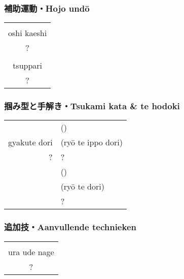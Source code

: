 \subsubsection{補助運動・Hojo und\={o}}
\begin{table}[H]
\begin{center}
\begin{tabular}{c}
    \ruby{}{}\ruby{}{}\\
    oshi kaeshi\\
    ?\\
    \hline
    \ruby{}{}\\
    tsuppari\\
    ?
\end{tabular}
\end{center}
\label{kyuu_5_hojo_undou}
\end{table}

\subsubsection{掴み型と手解き・Tsukami kata \& te hodoki}
\begin{table}[H]
\begin{center}
\begin{tabular}{rl}
    \ruby{}{}\ruby{}{} & (\ruby{}{})\\
    gyakute dori & (ry\={o} te ippo dori)\\
    ? & ?\\
    \hline
    & (\ruby{}{})\\
    & (ry\={o} te dori)\\
    & ?
\end{tabular}
\end{center}
\label{kyuu_5_te_hodoki}
\end{table}

\subsubsection{追加技・Aanvullende technieken}
\begin{table}[H]
\begin{center}
\begin{tabular}{c}
    \ruby{}{}\ruby{}{}\\
    ura ude nage\\
    ?
\end{tabular}
\end{center}
\label{kyuu_5_additional}
\end{table}

